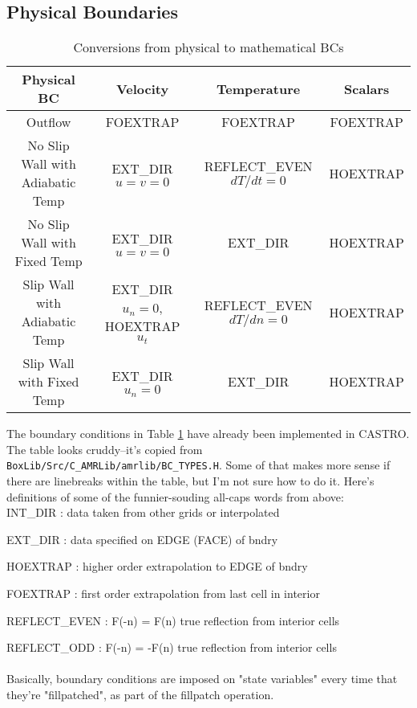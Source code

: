 \subsection{Physical Boundaries}
\begin{table}[h]
\begin{scriptsize}
\begin{center}
\begin{tabular}{|c|c|c|c|} \hline
Physical BC & Velocity & Temperature & Scalars \\
\hline
Outflow & FOEXTRAP & FOEXTRAP & FOEXTRAP \\
No Slip Wall with Adiabatic Temp & EXT\_DIR $u=v=0$ & REFLECT\_EVEN $dT/dt=0$ & HOEXTRAP \\
No Slip Wall with Fixed Temp & EXT\_DIR $u=v=0$ & EXT\_DIR & HOEXTRAP \\
Slip Wall with Adiabatic Temp & EXT\_DIR $u_n=0$, HOEXTRAP $u_t$ & REFLECT\_EVEN $dT/dn=0$ & HOEXTRAP \\
Slip Wall with Fixed Temp & EXT\_DIR $u_n=0$ & EXT\_DIR & HOEXTRAP \\
\hline
\end{tabular}
\end{center}
\caption{Conversions from physical to mathematical BCs}
\label{Table:BC}
\end{scriptsize}
\end{table}
The boundary conditions in Table \ref{Table:BC} have already been implemented in CASTRO.  
The table looks cruddy--it's copied from {\tt BoxLib/Src/C\_AMRLib/amrlib/BC\_TYPES.H}. 
Some of that makes more sense if there are linebreaks within the table, 
but I'm not sure how to do it. Here's definitions of some of the funnier-souding all-caps words from above:\\

INT\_DIR  : data taken from other grids or interpolated

EXT\_DIR  : data specified on EDGE (FACE) of bndry

HOEXTRAP  : higher order extrapolation to EDGE of bndry

FOEXTRAP  : first order extrapolation from last cell in interior

REFLECT\_EVEN : F(-n) = F(n) true reflection from interior cells

REFLECT\_ODD  : F(-n) = -F(n) true reflection from interior cells\\ \\
Basically, boundary conditions are imposed on "state variables" every time that they're "fillpatched", as part of the fillpatch operation.

